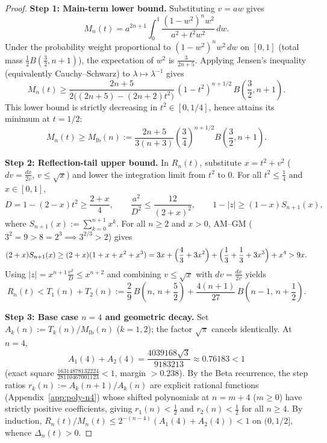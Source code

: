 \documentclass[11pt,a4paper]{article}
\theoremstyle{remark}
\numberwithin{equation}{section}
\begin{document}
\begin{proof}
\textbf{Step 1: Main-term lower bound.}
Substituting $v = aw$ gives
\[
    M_n(t) = a^{2n+1}\int_0^1 \frac{(1 - w^2)^n w^2}{a^2 + t^2 w^2}\,dw.
\]
Under the probability weight proportional to $(1 - w^2)^n w^2\,dw$ on $[0,1]$ (total mass $\frac12 B(\frac32, n+1)$), the expectation of $w^2$ is $\frac{3}{2n+5}$. Applying Jensen's inequality (equivalently Cauchy--Schwarz) to $\lambda \mapsto \lambda^{-1}$ gives
\[
    M_n(t)
    \ge \frac{2n+5}{2\bigl((2n+5) - (2n+2)t^2\bigr)}\,(1 - t^2)^{n + 1/2}\,B\!\left(\frac32, n+1\right).
\]
This lower bound is strictly decreasing in $t^2 \in [0, 1/4]$, hence attains its minimum at $t = 1/2$:
\begin{equation}
    M_n(t) \ge M_{\mathrm{lb}}(n)
    := \frac{2n + 5}{3(n + 3)}\left(\frac34\right)^{n + 1/2} B\!\left(\frac32, n + 1\right).
    \label{eq:Mlb}
\end{equation}

\smallskip
\noindent\textbf{Step 2: Reflection-tail upper bound.}
In $R_n(t)$, substitute $x = t^2 + v^2$ ($dv = \frac{dx}{2v}$, $v \le \sqrt{x}$) and lower the integration limit from $t^2$ to $0$. For all $t^2 \le \frac14$ and $x \in [0,1]$,
\[
    D = 1 - (2 - x)t^2 \ge \frac{2 + x}{4},
    \qquad
    \frac{a^2}{D^2} \le \frac{12}{(2 + x)^2},
    \qquad
    1 - |z| \ge (1 - x)S_{n+1}(x),
\]
where $S_{n+1}(x) := \sum_{k=0}^{n+1} x^k$. For all $n \ge 2$ and $x > 0$, AM--GM ($3^2 = 9 > 8 = 2^3 \implies 3^{2/3} > 2$) gives
\[
    (2 + x)S_{n+1}(x)
    \ge (2 + x)(1 + x + x^2 + x^3)
    = 3x + \Bigl(\frac43 + 3x^2\Bigr) + \Bigl(\frac13 + \frac13 + 3x^3\Bigr) + x^4
    > 9x.
\]
Using $|z| = x^{n+1}\frac{v^2}{D} \le x^{n+2}$ and combining $v \le \sqrt{x}$ with $dv = \frac{dx}{2v}$ yields
\begin{equation}
    R_n(t) < T_1(n) + T_2(n)
    := \frac29\, B\!\left(n,\, n + \frac52\right)
     + \frac{4(n + 1)}{27}\, B\!\left(n - 1,\, n + \frac12\right).
    \label{eq:Rub}
\end{equation}

\smallskip
\noindent\textbf{Step 3: Base case $n = 4$ and geometric decay.}
Set $A_k(n) := T_k(n)/M_{\mathrm{lb}}(n)$ ($k = 1, 2$); the factor $\sqrt{\pi}$ cancels identically. At $n = 4$,
\[
    A_1(4) + A_2(4) = \frac{4039168\sqrt{3}}{9183213} \approx 0.76183 < 1
\]
(exact square $\frac{16314878132224}{28110467001123} < 1$, margin $> 0.238$). By the Beta recurrence, the step ratios $r_k(n) := A_k(n+1)/A_k(n)$ are explicit rational functions (Appendix~\ref{app:poly-n4}) whose shifted polynomials at $n = m + 4$ ($m \ge 0$) have strictly positive coefficients, giving $r_1(n) < \frac12$ and $r_2(n) < \frac12$ for all $n \ge 4$. By induction, $R_n(t)/M_n(t) \le 2^{-(n-4)}(A_1(4) + A_2(4)) < 1$ on $(0, 1/2]$, whence $\Delta_n(t) > 0$.
\end{proof}
\end{document}

